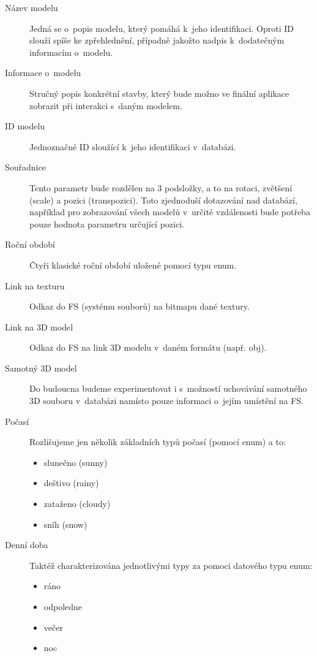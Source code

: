 \documentclass[thesis=B,czech]{FITthesis}[2012/06/26]
\begin{document}
	\begin{description}
		\item[Název modelu]
			Jedná se o~popis modelu, který pomáhá k~jeho identifikaci. Oproti ID slouží spíše ke zpřehlednění, případně jakožto nadpis k~dodatečným informacím o~modelu.

		\item[Informace o~modelu]
			Stručný popis konkrétní stavby, který bude možno ve finální aplikace zobrazit při interakci s~daným modelem.

		\item[ID modelu]
			Jednoznačné ID sloužící k~jeho identifikaci v~databázi.

		\item[Souřadnice]
			Tento parametr bude rozdělen na 3 podsložky, a to na rotaci, zvětšení (scale) a pozici (transpozici). Toto zjednoduší dotazování nad databází, například pro zobrazování všech modelů v~určité vzdálenosti bude potřeba pouze hodnota parametru určující pozici.
			
		\item[Roční období]
			Čtyři klasické roční období uložené pomocí typu enum.

		\item[Link na texturu]
			Odkaz do FS (systému souborů) na bitmapu dané textury.

		\item[Link na 3D model]
			Odkaz do FS na link 3D modelu v~daném formátu (např. obj).

		\item[Samotný 3D model]
			Do budoucna budeme experimentovat i s~možností uchovávání samotného 3D souboru v~databázi namísto pouze informaci o~jejím umístění na FS.
			
		\item[Počasí]
			Rozlišujeme jen několik základních typů počasí (pomocí enum) a to:

	    	\begin{itemize}
    			\item slunečno (sunny)
    			\item deštivo (rainy)
    			\item zataženo (cloudy)
    			\item sníh (snow)
    		\end{itemize}

		\item[Denní doba]
			Taktéž charakterizována jednotlivými typy za pomoci datového typu enum:
	    	\begin{itemize}
    			\item ráno
    			\item odpoledne
    			\item večer
    			\item noc
    		\end{itemize}
			
	\end{description}
	
\end{document}
